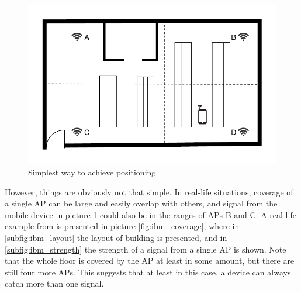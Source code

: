 \documentclass[12pt,a4paper,oneside,pdftex]{report}
\begin{document}
\begin{figure}
    \label{fig:position_1}
    \includegraphics{images/positioning_1.pdf}
    \caption{Simplest way to achieve positioning}
\end{figure}

However, things are obviously not that simple. In real-life situations, coverage of a single AP can be large and easily overlap with others, and signal from the mobile device in picture \ref{fig:position_1} could also be in the ranges of APs B and C. A real-life example from \cite{xiang2004} is presented in picture \ref{fig:ibm_coverage}, where in \ref{subfig:ibm_layout} the layout of building is presented, and in \ref{subfig:ibm_strength} the strength of a signal from a single AP is shown. Note that the whole floor is covered by the AP at least in some amount, but there are still four more APs. This suggests that at least in this case, a device can always catch more than one signal.
\end{document}

